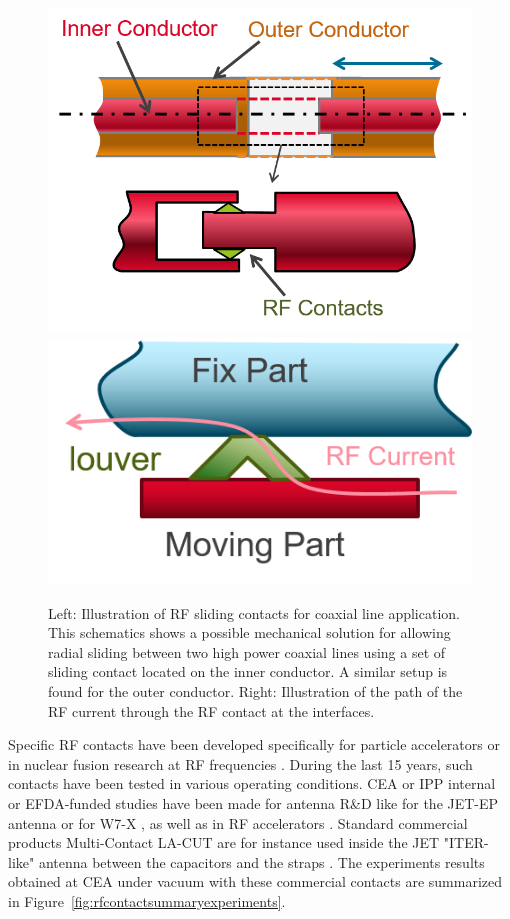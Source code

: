 {\begin{figure}[h]
	\centering
	\includegraphics[width=0.45\linewidth]{figures/chap3/RF_contacts/RF_contact_purpose}
	\includegraphics[width=0.45\linewidth]{figures/chap3/RF_contacts/RF_contact_RFcurrent}
	\caption{Left: Illustration of RF sliding contacts for coaxial line application. This schematics shows a possible mechanical solution for allowing radial sliding between two high power coaxial lines using a set of sliding contact located on the inner conductor. A similar setup is found for the outer conductor. Right: Illustration of the path of the RF current through the RF contact at the interfaces.}
	\label{fig:rfcontactpurpose}
\end{figure}

%


Specific RF contacts have been developed specifically for particle accelerators  or in nuclear fusion research at RF frequencies  . During the last 15 years, such contacts have been tested in various operating conditions. CEA or IPP internal or EFDA-funded studies have been made for antenna R\&D like for the JET-EP antenna or for W7-X , as well as in RF accelerators . Standard commercial products Multi-Contact LA-CUT are for instance used inside the JET "ITER-like" antenna between the capacitors and the straps . The experiments results obtained at CEA under vacuum with these commercial contacts are summarized in Figure~\ref{fig:rfcontactsummaryexperiments}.



}
